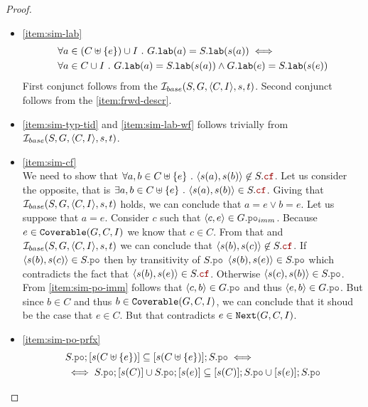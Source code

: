 \documentclass[12pt]{article}
\begin{document}
\begin{proof}
\begin{itemize}

  \item \ref{item:sim-lab} \\
    \begin{equation}
      \begin{split}
        & \forall{a \in (C \uplus \{e\}) \cup I} ~.~ G.{\mathtt{lab}}(a) = S.{\mathtt{lab}}(s(a)) \iff \\
        & \forall{a \in C \cup I} ~.~
          G.{\mathtt{lab}}(a) = S.{\mathtt{lab}}(s(a)) \wedge G.{\mathtt{lab}}(e) = S.{\mathtt{lab}}(s(e))
      \end{split}
    \end{equation}
    First conjunct follows from the $\mathcal{I}_{base}(S, G, \langle C, I \rangle, s, t)$.
    Second conjunct follows from the \ref{item:frwd-descr}.

  \item \ref{item:sim-typ-tid} and \ref{item:sim-lab-wf}
    follows trivially from $\mathcal{I}_{base}(S, G, \langle C, I \rangle, s, t)$.
    
  \item \ref{item:sim-cf} \\
    We need to show that
    $\forall{a, b \in C \uplus \{e\}} ~.~ \tup{s(a), s(b)} \not\in S.\lCF$.
    Let us consider the opposite, that is
    $\exists{a, b \in C \uplus \{e\}} ~.~ \tup{s(a), s(b)} \in S.\lCF$.
    Giving that $\mathcal{I}_{base}(S, G, \langle C, I \rangle, s, t)$ holds,
    we can conclude that \mbox{$a = e \vee b = e$}.
    Let us suppose that $a = e$.
    Consider $c$ such that $\tup{c, e} \in G.\lPO_{imm}$.
    Because $e \in {\mathtt{Coverable}}(G, C, I)$ we know that $c \in C$.
    From that and $\mathcal{I}_{base}(S, G, \langle C, I \rangle, s, t)$
    we can conclude that $\tup{s(b), s(c)} \not\in S.\lCF$.
    If $\tup{s(b), s(c)} \in S.\lPO$ then by transitivity of $S.\lPO$
    $\tup{s(b), s(e)} \in S.\lPO$
    which contradicts the fact that $\tup{s(b), s(e)} \in S.\lCF$.
    Otherwise \mbox{$\tup{s(c), s(b)} \in S.\lPO$}.
    From \ref{item:sim-po-imm} follows that $\tup{c, b} \in G.\lPO$
    and thus $\tup{e, b} \in G.\lPO$.
    But since $b \in C$ and thus $b \in {\mathtt{Coverable}}(G, C, I)$,
    we can conclude that it shoud be the case that $e \in C$.
    But that contradicts $e \in {\mathtt{Next}}(G, C, I)$.

  \item \ref{item:sim-po-prfx} \\

    \begin{equation*}
      \begin{split}
        &     S.\lPO;[s(C \uplus \{e\})] \subseteq [s(C \uplus \{e\})];S.\lPO \iff \\
        &\iff S.\lPO;[s(C)] \cup S.\lPO;[s(e)] \subseteq [s(C)];S.\lPO \cup [s(e)];S.\lPO
      \end{split}
    \end{equation*}


\end{itemize}
\end{proof}
\end{document}
